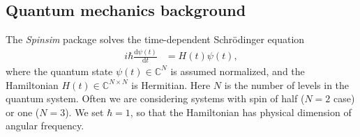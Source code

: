 \documentclass{jors}
\newcommand{\supervisordisagreement}[2]{\textcolor{green}{\texttt{{Supervisor disagreement!!! <<<<<<< Lincoln}}} \textcolor{blue}{#1} \textcolor{green}{\texttt{=======}} \textcolor{red}{#2} \textcolor{green}{\texttt{>>>>>>> James}}}
\begin{document}
	\subsection{Quantum mechanics background}
		The \emph{Spinsim} package solves the time-dependent Schr\"{o}dinger equation
		\begin{align}
			i\hbar\frac{\text{d}\psi(t)}{\text{d}t} &= H(t)\psi(t),\label{eq:schroedinger}
		\end{align}
		where the quantum state $ \psi(t) \in \mathbb{C}^N $ is assumed normalized, and the Hamiltonian $ H(t) \in \mathbb{C}^{N \times N} $ is Hermitian.
		Here $ N $ is the number of levels in the quantum system.
		Often we are considering systems with spin of half ($ N = 2 $ case) or one ($ N = 3 $).
		We set $ \hbar = 1 $, so that the Hamiltonian has physical dimension of angular frequency.
		
		
\end{document}
